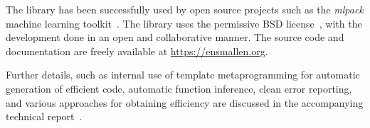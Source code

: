 \documentclass[twoside,11pt]{article}
\begin{document}
The library has been successfully used by open source projects
such as the {\it mlpack} machine learning toolkit~\citep{mlpack2018}.
The library uses the permissive BSD license~\citep{Laurent_2008},
with the development done in an open and collaborative manner.
The source code and documentation are freely available at \mbox{\url{https://ensmallen.org}}.

Further details, such as internal use of template metaprogramming
for automatic generation of efficient code, automatic function inference,
clean error reporting, and various approaches for obtaining efficiency
are discussed in the accompanying technical report~\citep{ensmallen2020}.




\end{document}
